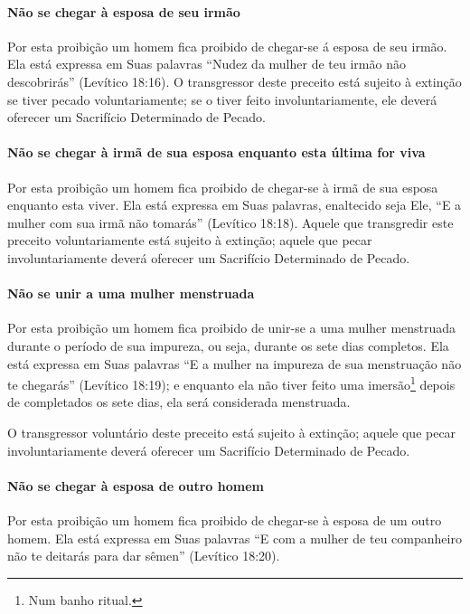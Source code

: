 \paragraph{Não se chegar à esposa de seu irmão}

Por esta proibição um homem fica proibido de chegar-se á esposa de seu
irmão. Ela está expressa em Suas palavras ``Nudez da mulher de teu
irmão não descobrirás'' (Levítico 18:16). O transgressor deste preceito
está sujeito à extinção se tiver pecado voluntariamente; se o tiver
feito involuntariamente, ele deverá oferecer um Sacrifício Determinado
de Pecado.

\paragraph{Não se chegar à irmã de sua esposa enquanto esta última for viva}

Por esta proibição um homem fica proibido de chegar-se à irmã de sua
esposa enquanto esta viver. Ela está expressa em Suas palavras,
enaltecido seja Ele, ``E a mulher com sua irmã não tomarás'' (Levítico
18:18). Aquele que transgredir este preceito voluntariamente está
sujeito à extinção; aquele que pecar involuntariamente deverá oferecer
um Sacrifício Determinado de Pecado.

\paragraph{Não se unir a uma mulher menstruada}

Por esta proibição um homem fica proibido de unir-se a uma mulher
menstruada durante o período de sua impureza, ou seja, durante os sete
dias completos. Ela está expressa em Suas palavras ``E a mulher na impureza
de sua menstruação não te chegarás'' (Levítico 18:19); e enquanto ela
não tiver feito uma imersão\footnote{Num banho ritual.} depois de completados
os sete dias, ela será considerada menstruada.

O transgressor voluntário deste preceito está sujeito à extinção; aquele
que pecar involuntariamente deverá oferecer um Sacrifício Determinado de
Pecado.

\paragraph{Não se chegar à esposa de outro homem}

Por esta proibição um homem fica proibido de chegar-se à esposa de um
outro homem. Ela está expressa em Suas palavras ``E com a mulher de teu
companheiro não te deitarás para dar sêmen'' (Levítico 18:20).

